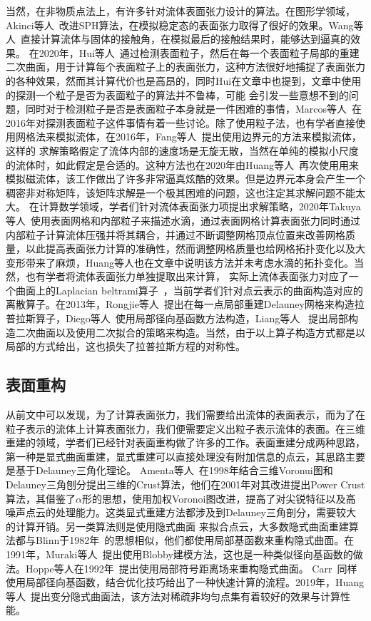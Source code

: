 当然，在非物质点法上，有许多针对流体表面张力设计的算法。在图形学领域，Akinci等人~\cite{akinci2013versatile}改进SPH算法，在模拟稳定态的表面张力取得了很好的效果。Wang等人~\cite{wang2005water}直接计算流体与固体的接触角，在模拟最后的接触结果时，能够达到逼真的效果。
在2020年，Hui等人~\cite{wang2020codimensional}通过检测表面粒子，然后在每一个表面粒子局部的重建二次曲面，用于计算每个表面粒子上的表面张力，这种方法很好地捕捉了表面张力的各种效果，然而其计算代价也是高昂的，同时Hui在文章中也提到，文章中使用的探测一个粒子是否为表面粒子的算法并不鲁棒，可能
会引发一些意想不到的问题，同时对于检测粒子是否是表面粒子本身就是一件困难的事情，Marcos等人~\cite{sandim2016boundary}在2016年对探测表面粒子这件事情有着一些讨论。除了使用粒子法，也有学者直接使用网格法来模拟流体，在2016年，Fang等人~\cite{da2016surface}提出使用边界元的方法来模拟流体，这样的
求解策略假定了流体内部的速度场是无旋无散，当然在单纯的模拟小尺度的流体时，如此假定是合适的。这种方法也在2020年由Huang等人~\cite{huang2020surface}再次使用用来模拟磁流体，该工作做出了许多非常逼真炫酷的效果。但是边界元本身会产生一个稠密非对称矩阵，该矩阵求解是一个极其困难的问题，这也注定其求解问题不能太大。
在计算数学领域，学者们针对流体表面张力项提出求解策略，2020年Takuya等人~\cite{matsunaga2020moving}使用表面网格和内部粒子来描述水滴，通过表面网格计算表面张力同时通过内部粒子计算流体压强并将其耦合，并通过不断调整网格顶点位置来改善网格质量，以此提高表面张力计算的准确性，然而调整网格质量也给网格拓扑变化以及大变形带来了麻烦，Huang等人也在文章中说明该方法并未考虑水滴的拓扑变化。当然，也有学者将流体表面张力单独提取出来计算，
实际上流体表面张力对应了一个曲面上的Laplacian beltrami算子~\cite{needham2021visual}，当前学者们针对点云表示的曲面构造对应的离散算子。在2013年，Rongjie等人~\cite{lai2013local}提出在每一点局部重建Delauney网格来构造拉普拉斯算子，Diego等人~\cite{alvarez2021local}使用局部径向基函数方法构造，Liang等人~\cite{liang2013solving}
提出局部构造二次曲面以及使用二次拟合的策略来构造。当然，由于以上算子构造方式都是以局部的方式给出，这也损失了拉普拉斯方程的对称性。
\subsection{表面重构} 
从前文中可以发现，为了计算表面张力，我们需要给出流体的表面表示，而为了在粒子表示的流体上计算表面张力，我们便需要定义出粒子表示流体的表面。在三维重建的领域，学者们已经针对表面重构做了许多的工作。表面重建分成两种思路，第一种是显式曲面重建，显式重建可以直接处理没有附加信息的点云，其思路主要是基于Delauney三角化理论。
Amenta等人~\cite{amenta1998new}在1998年结合三维Voronui图和Delauney三角刨分提出三维的Crust算法，他们在2001年对其改进提出Power Crust算法，其借鉴了$\alpha$形的思想，使用加权Voronoi图改进，提高了对尖锐特征以及高噪声点云的处理能力。这类显式重建方法都涉及到Delauney三角剖分，需要较大的计算开销。另一类算法则是使用隐式曲面
来拟合点云，大多数隐式曲面重建算法都与Blinn于1982年~\cite{blinn1982generalization}的思想相似，他们都使用局部基函数来重构隐式曲面。在1991年，Muraki等人~\cite{muraki1991volumetric}提出使用Blobby建模方法，这也是一种类似径向基函数的做法。Hoppe等人在1992年~\cite{hoppe1992surface}提出使用局部符号距离场来重构隐式曲面。
Carr~\cite{carr2001reconstruction}同样使用局部径向基函数，结合优化技巧给出了一种快速计算的流程。2019年，Huang等人~\cite{huang2019variational}提出变分隐式曲面法，该方法对稀疏非均匀点集有着较好的效果与计算性能。

